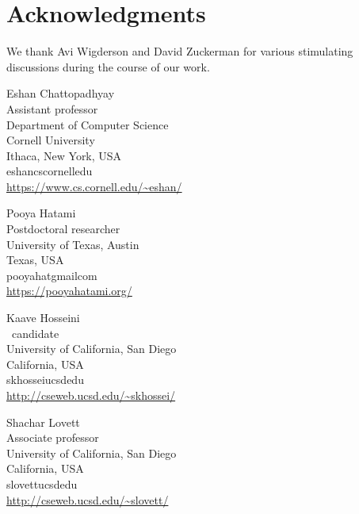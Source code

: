 \documentclass{toc}
\begin{document}
\section*{Acknowledgments}
We thank Avi Wigderson and David Zuckerman for various stimulating discussions during the course of our work.


















%
%
%
%


%
%
%
%
%
\begin{tocauthors}
\begin{tocinfo}[chattopadhyay]
 Eshan Chattopadhyay\\
 Assistant professor\\
 Department of Computer Science \\
 Cornell University\\
 Ithaca, New York, USA\\
 eshan\tocat{}cs\tocdot{}cornell\tocdot{}edu\\ %
 \url{https://www.cs.cornell.edu/~eshan/}      %
\end{tocinfo}
\begin{tocinfo}[hatami]
  Pooya Hatami\\
  Postdoctoral researcher\\
  University of Texas, Austin\\
  Texas, USA\\
  pooyahat\tocat{}gmail\tocdot{}com\\
  \url{https://pooyahatami.org/}
\end{tocinfo}
\begin{tocinfo}[hosseini]
  Kaave Hosseini\\
  \phd\ candidate\\
  University of California, San Diego\\
  California, USA\\
  skhossei\tocat{}ucsd\tocdot{}edu\\
  \url{http://cseweb.ucsd.edu/~skhossei/}
\end{tocinfo}
\begin{tocinfo}[lovett]
  Shachar Lovett\\
  Associate professor\\
  University of California, San Diego\\
  California, USA\\
  slovett\tocat{}ucsd\tocdot{}edu\\
  \url{http://cseweb.ucsd.edu/~slovett/}
\end{tocinfo}

\end{tocauthors}
\end{document}
